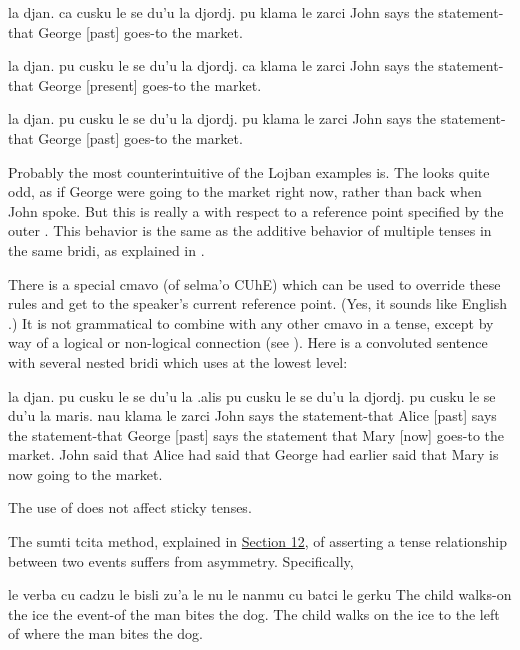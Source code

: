 \begin{example}
la djan. ca cusku le se du'u\n
\T	la djordj. pu klama le zarci\n
John  says the statement-that\n
\T	George [past] goes-to the market.
\end{example}

\begin{example}
la djan. pu cusku le se du'u\n
\T	la djordj. ca klama le zarci\n
John  says the statement-that\n
\T	George [present] goes-to the market.
\end{example}

\begin{example}
la djan. pu cusku le se du'u\n
\T	la djordj. pu klama le zarci\n
John  says the statement-that\n
\T	George [past] goes-to the market.
\end{example}

Probably the most counterintuitive of the Lojban examples is. The  looks quite odd,
    as if George were going to the market right now, rather than
    back when John spoke. But this  is really a  with
    respect to a reference point specified by the outer .
    This behavior is the same as the additive behavior of multiple
    tenses in the same bridi, as explained in .

There is a special cmavo  (of selma'o CUhE) which can
    be used to override these rules and get to the speaker's
    current reference point. (Yes, it sounds like English .)
    It is not grammatical to combine  with any other cmavo
    in a tense, except by way of a logical or non-logical
    connection (see ). Here is a
    convoluted sentence with several nested bridi which uses
     at the lowest level:
\begin{example}
la djan. pu cusku le se du'u\n
\T	la .alis pu cusku le se du'u\n
\T	la djordj. pu cusku le se du'u\n
\T	la maris. nau klama le zarci\n
John  says the statement-that\n
\T	Alice [past] says the statement-that\n
\T	George [past] says the statement that\n
\T	Mary [now] goes-to the market.\n
John said that Alice had said that George had earlier\n
\T	said that Mary is now going to the market.
\end{example}

The use of  does not affect sticky tenses.



The sumti tcita method, explained in \hyperref[sec:10:12]{Section
    12}, of asserting a tense relationship between two events
    suffers from asymmetry. Specifically,
\begin{example}
le verba cu cadzu le bisli\n
\T	zu'a le nu le nanmu cu batci le gerku\n
The child walks-on the ice\n
\T	{} the event-of the man bites the dog.\n
The child walks on the ice to the left of where\n
\T	the man bites the dog.
\end{example}

